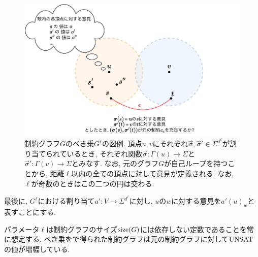 \begin{figure}[h]
  \centering
  \includegraphics[width=\textwidth]{images/gap_amplification.pdf}
  \caption{制約グラフ$G$のべき乗$G^\ell$の図例. 頂点$u,v$にそれぞれ$\vec{\sigma},\vec{\sigma}'\in\Sigma^{d^{\ell}}$が割り当てられているとき, それぞれ関数$\vec{\sigma}\colon \Gamma(u)\to\Sigma$と$\vec{\sigma}'\colon \Gamma(v)\to\Sigma$とみなす. なお, 元のグラフ$G$が自己ループを持つことから, 距離$\ell$以内の全ての頂点に対して意見が定義される. なお, $\ell$が奇数のときはこの二つの円は交わる. \label{fig:gap-amplification}}
\end{figure}

最後に, $G^\ell$における割り当て$a'\colon V\to\Sigma^{d^{\ell}}$に対し, $u$の$w$に対する意見を$a'(u)_w$と表すことにする.

パラメータ$\ell$は制約グラフのサイズ$\mathrm{size}(G)$には依存しない定数であることを常に想定する.
べき乗をで得られた制約グラフは元の制約グラフに対して$\mathrm{UNSAT}$の値が増幅している.

